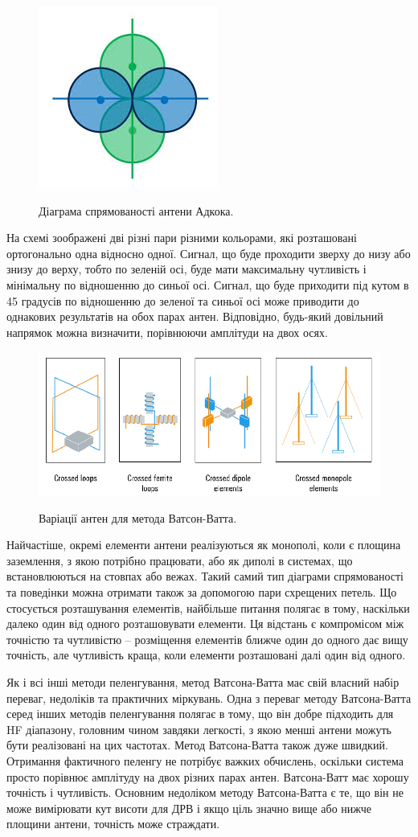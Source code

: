 \documentclass{article}
\begin{document}
\begin{figure}[H]
	\centering
	{\includegraphics[width=0.2\linewidth]{images/adkock_antenna.jpeg}}
	\caption{\label{fig:rdf:dopler} Діаграма спрямованості антени Адкока.}
\end{figure}

На схемі зоображені дві різні пари різними кольорами, які розташовані ортогонально одна відносно одної. Сигнал, що буде проходити зверху до низу або знизу до верху, тобто по зеленій осі, буде мати максимальну чутливість і мінімальну по відношенню до синьої осі. Сигнал, що буде приходити під кутом в 45 градусів по відношенню до зеленої та синьої осі може приводити до однакових результатів на обох парах антен. Відповідно, будь-який довільний напрямок можна визначити, порівнюючи амплітуди на двох осях.

\begin{figure}[H]
	\centering
	{\includegraphics[width=0.7
		\linewidth]{images/adkock_antennas.png}}
	\caption{\label{fig:rdf:dopler} Варіації антен для метода Ватсон-Ватта.}
\end{figure}

Найчастіше, окремі елементи антени реалізуються як монополі, коли є площина заземлення, з якою потрібно працювати, або як диполі в системах, що встановлюються на стовпах або вежах. Такий самий тип діаграми спрямованості та поведінки можна отримати також за допомогою пари схрещених петель. Що стосується розташування елементів, найбільше питання полягає в тому, наскільки далеко один від одного розташовувати елементи. Ця відстань є компромісом між точністю та чутливістю – розміщення елементів ближче один до одного дає вищу точність, але чутливість краща, коли елементи розташовані далі один від одного.

Як і всі інші методи пеленгування, метод Ватсона-Ватта має свій власний набір переваг, недоліків та практичних міркувань. Одна з переваг методу Ватсона-Ватта серед інших методів пеленгування полягає в тому, що він добре підходить для HF діапазону, головним чином завдяки легкості, з якою менші антени можуть бути реалізовані на цих частотах. Метод Ватсона-Ватта також дуже швидкий. Отримання фактичного пеленгу не потрібує важких обчислень, оскільки система просто порівнює амплітуду на двох різних парах антен. Ватсона-Ватт має хорошу точність і чутливість. Основним недоліком методу Ватсона-Ватта є те, що він не може вимірювати кут висоти для ДРВ і якщо ціль значно вище або нижче площини антени, точність може страждати.
\end{document}

